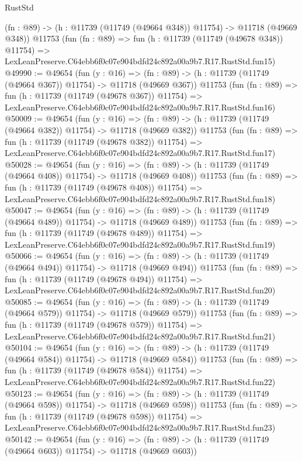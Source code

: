 \begin{lexlean}{RustStd}
\begin{coremodule}
    (fn : @89) -> (h : @11739 (@11749 (@49664 @348)) @11754) -> @11718 (@49669 @348))
    @11753
    (fun (fn : @89) =>
    fun (h : @11739 (@11749 (@49678 @348)) @11754) =>
    LexLeanPreserve.C64ebb6f0c07e904bdfd24c892a00a9b7.R17.RustStd.fun15)
@49990 := @49654
    (fun (y : @16) =>
    (fn : @89) -> (h : @11739 (@11749 (@49664 @367)) @11754) -> @11718 (@49669 @367))
    @11753
    (fun (fn : @89) =>
    fun (h : @11739 (@11749 (@49678 @367)) @11754) =>
    LexLeanPreserve.C64ebb6f0c07e904bdfd24c892a00a9b7.R17.RustStd.fun16)
@50009 := @49654
    (fun (y : @16) =>
    (fn : @89) -> (h : @11739 (@11749 (@49664 @382)) @11754) -> @11718 (@49669 @382))
    @11753
    (fun (fn : @89) =>
    fun (h : @11739 (@11749 (@49678 @382)) @11754) =>
    LexLeanPreserve.C64ebb6f0c07e904bdfd24c892a00a9b7.R17.RustStd.fun17)
@50028 := @49654
    (fun (y : @16) =>
    (fn : @89) -> (h : @11739 (@11749 (@49664 @408)) @11754) -> @11718 (@49669 @408))
    @11753
    (fun (fn : @89) =>
    fun (h : @11739 (@11749 (@49678 @408)) @11754) =>
    LexLeanPreserve.C64ebb6f0c07e904bdfd24c892a00a9b7.R17.RustStd.fun18)
@50047 := @49654
    (fun (y : @16) =>
    (fn : @89) -> (h : @11739 (@11749 (@49664 @489)) @11754) -> @11718 (@49669 @489))
    @11753
    (fun (fn : @89) =>
    fun (h : @11739 (@11749 (@49678 @489)) @11754) =>
    LexLeanPreserve.C64ebb6f0c07e904bdfd24c892a00a9b7.R17.RustStd.fun19)
@50066 := @49654
    (fun (y : @16) =>
    (fn : @89) -> (h : @11739 (@11749 (@49664 @494)) @11754) -> @11718 (@49669 @494))
    @11753
    (fun (fn : @89) =>
    fun (h : @11739 (@11749 (@49678 @494)) @11754) =>
    LexLeanPreserve.C64ebb6f0c07e904bdfd24c892a00a9b7.R17.RustStd.fun20)
@50085 := @49654
    (fun (y : @16) =>
    (fn : @89) -> (h : @11739 (@11749 (@49664 @579)) @11754) -> @11718 (@49669 @579))
    @11753
    (fun (fn : @89) =>
    fun (h : @11739 (@11749 (@49678 @579)) @11754) =>
    LexLeanPreserve.C64ebb6f0c07e904bdfd24c892a00a9b7.R17.RustStd.fun21)
@50104 := @49654
    (fun (y : @16) =>
    (fn : @89) -> (h : @11739 (@11749 (@49664 @584)) @11754) -> @11718 (@49669 @584))
    @11753
    (fun (fn : @89) =>
    fun (h : @11739 (@11749 (@49678 @584)) @11754) =>
    LexLeanPreserve.C64ebb6f0c07e904bdfd24c892a00a9b7.R17.RustStd.fun22)
@50123 := @49654
    (fun (y : @16) =>
    (fn : @89) -> (h : @11739 (@11749 (@49664 @598)) @11754) -> @11718 (@49669 @598))
    @11753
    (fun (fn : @89) =>
    fun (h : @11739 (@11749 (@49678 @598)) @11754) =>
    LexLeanPreserve.C64ebb6f0c07e904bdfd24c892a00a9b7.R17.RustStd.fun23)
@50142 := @49654
    (fun (y : @16) =>
    (fn : @89) -> (h : @11739 (@11749 (@49664 @603)) @11754) -> @11718 (@49669 @603))

\end{coremodule}
\end{lexlean}
